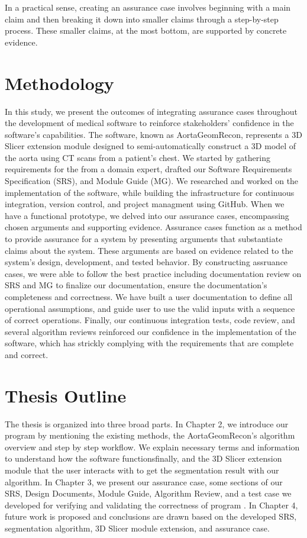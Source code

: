 In a practical sense, creating an assurance case involves beginning with a main claim and then breaking it down into smaller claims through a step-by-step process. These smaller claims, at the most bottom, are supported by concrete evidence.


\section{Methodology} \label{methodology}
In this study, we present the outcomes of integrating assurance cases throughout the development of medical software to reinforce stakeholders' confidence in the software's capabilities. The software, known as AortaGeomRecon, represents a 3D Slicer \cite{Kikinis2014} extension module designed to semi-automatically construct a 3D model of the aorta using CT scans from a patient's chest. We started by gathering requirements for the \progname{} from a domain expert, drafted our Software Requirements Specification (SRS), and Module Guide (MG). We researched and worked on the implementation of the software, while building the infrastructure for continuous integration, version control, and project managment using GitHub. When we have a functional prototype, we delved into our assurance cases, encompassing chosen arguments and supporting evidence. Assurance cases function as a method to provide assurance for a system by presenting arguments that substantiate claims about the system. These arguments are based on evidence related to the system's design, development, and tested behavior. By constructing assruance cases, we were able to follow the best practice including documentation review on SRS and MG to finalize our documentation, ensure the documentation's completeness and correctness. We have built a user documentation to define all operational assumptions, and guide user to use the valid inputs with a sequence of correct operations. Finally, our continuous integration tests, code review, and several algorithm reviews reinforced our confidence in the implementation of the software, which has strickly complying with the requirements that are complete and correct.

\section{Thesis Outline} \label{TO}

The thesis is organized into three broad parts. In Chapter 2, we introduce our program \progname{} by mentioning the existing methods, the AortaGeomRecon's algorithm overview and step by step  workflow. We explain necessary terms and information to understand how the software functionsfinally, and the 3D Slicer \cite{Kikinis2014} extension module that the user interacts with to get the segmentation result with our algorithm. In Chapter 3, we present our assurance case, some sections of our SRS, Design Documents, Module Guide, Algorithm Review, and a test case we developed for verifying and validating the correctness of program \progname{}. In Chapter 4, future work is proposed and conclusions are drawn based on the developed SRS, segmentation algorithm, 3D Slicer module extension, and assurance case.